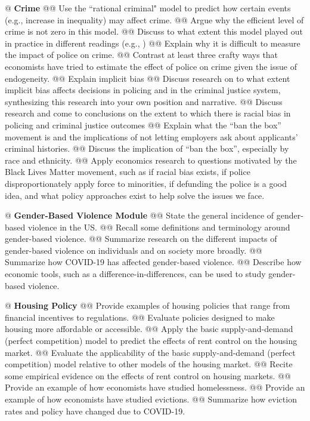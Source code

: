 \documentclass[11pt,letterpaper,final]{article}
\begin{document}
{@ \textbf{Crime}
@@ Use the ``rational criminal" model to predict how certain events (e.g., increase in inequality) may affect crime.
@@ Argue why the efficient level of crime is not zero in this model.
@@ Discuss to what extent this model played out in practice in different readings (e.g., \citep{Yang2017a})
@@ Explain why it is difficult to measure the impact of police on crime.
@@ Contrast at least three crafty ways that economists have tried to estimate the effect of police on crime given the issue of endogeneity.
@@ Explain implicit bias
@@ Discuss research on to what extent implicit bias affects decisions in policing and in the criminal justice system, synthesizing this research into your own position and narrative.
@@ Discuss research and come to conclusions on the extent to which there is racial bias in policing and criminal justice outcomes
@@ Explain what the ``ban the box'' movement is and the implications of not letting employers ask about applicants' criminal histories.
@@ Discuss the implication of ``ban the box'', especially by race and ethnicity.
@@ Apply economics research to questions motivated by the Black Lives Matter movement, such as if racial bias exists, if police disproportionately apply force to minorities, if defunding the police is a good idea, and what policy approaches exist to help solve the issues we face.

@ \textbf{Gender-Based Violence Module}
@@ State the general incidence of gender-based violence in the US.
@@ Recall some definitions and terminology around gender-based violence.
@@ Summarize research on the different impacts of gender-based violence on individuals and on society more broadly. 
@@ Summarize how COVID-19 has affected gender-based violence.
@@ Describe how economic tools, such as a difference-in-differences, can be used to study gender-based violence.

@ \textbf{Housing Policy}
@@ Provide examples of housing policies that range from financial incentives to regulations.
@@ Evaluate policies designed to make housing more affordable or accessible.
@@ Apply the basic supply-and-demand (perfect competition) model to predict the effects of rent control on the housing market.
@@ Evaluate the applicability of the basic supply-and-demand (perfect competition) model relative to other models of the housing market.
@@ Recite some empirical evidence on the effects of rent control on housing markets.
@@ Provide an example of how economists have studied homelessness.
@@ Provide an example of how economists have studied evictions.
@@ Summarize how eviction rates and policy have changed due to COVID-19.

}
\end{document}
